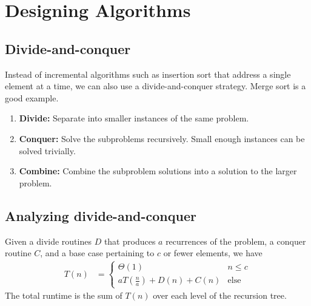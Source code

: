 \documentclass[12pt]{article}
\newcommand{\round}[1]{\left(  #1 \right)}
\begin{document}
\section{Designing Algorithms}

\subsection{Divide-and-conquer}
Instead of incremental algorithms such as insertion sort that address a single element at a time, we can also use a divide-and-conquer strategy. Merge sort is a good example.
\begin{enumerate}
    \item \textbf{Divide:} Separate into smaller instances of the same problem.
    \item \textbf{Conquer:} Solve the subproblems recursively. Small enough instances can be solved trivially.
    \item \textbf{Combine:} Combine the subproblem solutions into a solution to the larger problem.
\end{enumerate}

\subsection{Analyzing divide-and-conquer}
Given a divide routines $D$ that produces $a$ recurrences of the problem, a conquer routine $C$, and a base case pertaining to $c$ or fewer elements, we have
\begin{align*}
    T(n) &= \begin{cases}
        \Theta(1) & n \leq c \\
        aT\round{\frac{n}{a}} + D(n) + C(n) & \text{else}
    \end{cases}
\end{align*}
The total runtime is the sum of $T(n)$ over each level of the recursion tree.
\end{document}
